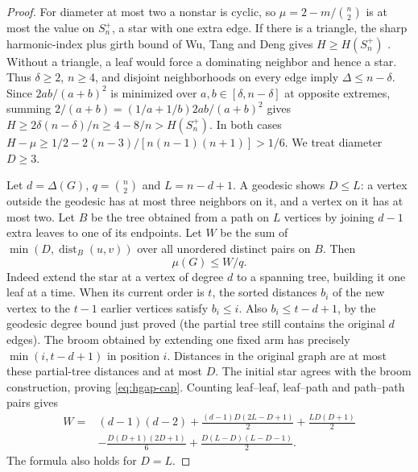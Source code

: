\documentclass[11pt,a4paper]{article}
\begin{document}
\begin{proof}
For diameter at most two a nonstar is cyclic, so $\mu=2-m/\binom n2$ is at most the value on $S_n^+$, a star with one extra edge. If there is a triangle, the sharp harmonic-index plus girth bound of Wu, Tang and Deng gives $H\ge H(S_n^+)$ \cite{hgapWu}. Without a triangle, a leaf would force a dominating neighbor and hence a star. Thus $\delta\ge2$, $n\ge4$, and disjoint neighborhoods on every edge imply $\Delta\le n-\delta$. Since $2ab/(a+b)^2$ is minimized over $a,b\in[\delta,n-\delta]$ at opposite extremes, summing $2/(a+b)=(1/a+1/b)2ab/(a+b)^2$ gives $H\ge2\delta(n-\delta)/n\ge4-8/n>H(S_n^+)$. In both cases $H-\mu\ge1/2-2(n-3)/[n(n-1)(n+1)]>1/6$. We treat diameter $D\ge3$.

Let $d=\Delta(G)$, $q=\binom n2$ and $L=n-d+1$. A geodesic shows $D\le L$: a vertex outside the geodesic has at most three neighbors on it, and a vertex on it has at most two. Let $B$ be the tree obtained from a path on $L$ vertices by joining $d-1$ extra leaves to one of its endpoints. Let $W$ be the sum of $\min(D,\operatorname{dist}_B(u,v))$ over all unordered distinct pairs on $B$. Then
\begin{equation}\label{eq:hgap-cap}
 \mu(G)\le W/q.
\end{equation}
Indeed extend the star at a vertex of degree $d$ to a spanning tree, building it one leaf at a time. When its current order is $t$, the sorted distances $b_i$ of the new vertex to the $t-1$ earlier vertices satisfy $b_i\le i$. Also $b_i\le t-d+1$, by the geodesic degree bound just proved (the partial tree still contains the original $d$ edges). The broom obtained by extending one fixed arm has precisely $\min(i,t-d+1)$ in position $i$. Distances in the original graph are at most these partial-tree distances and at most $D$. The initial star agrees with the broom construction, proving \eqref{eq:hgap-cap}. Counting leaf--leaf, leaf--path and path--path pairs gives
\begin{align*}
 W={}&(d-1)(d-2)+\frac{(d-1)D(2L-D+1)}2+\frac{LD(D+1)}2\\
 &-\frac{D(D+1)(2D+1)}6+\frac{D(L-D)(L-D-1)}2.
\end{align*}
The formula also holds for $D=L$.


\end{proof}
\end{document}
